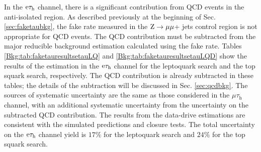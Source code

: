 \documentclass[12pt]{thesis}  %
\newcommand{\tauh}{\ensuremath{\tau_{\text{h}}}\xspace}
\newcommand{\Pe}{\ensuremath{\cmsSymbolFace{e}}\xspace}
\newcommand{\mutau}{\ensuremath{\mu\tauh}\xspace}
\newcommand{\etau}{\ensuremath{\Pe\tauh}\xspace}
\newcommand{\ra}{\ensuremath{\rightarrow}}%
\newcommand{\Zmm}{\ensuremath{\Z \ra \mu\mu}\xspace}%
\begin{document}
In the \etau channel, there is a significant contribution from QCD events in the anti-isolated region. As described previously at the beginning of Sec. \ref{sec:faketaubkg}, the fake rate measured in the \Zmm + jets control region is not appropriate for QCD events. The QCD contribution must be subtracted from the major reducible background estimation calculated using the fake rate. Tables \ref{Bkg:tab:faketauresultsetauLQ} and \ref{Bkg:tab:faketauresultsetauLQD} show the results of the estimation in the \etau channel for the leptoquark search and the top squark search, respectively. The QCD contribution is already subtracted in these tables; the details of the subtraction will be discussed in Sec. \ref{sec:qcdbkg}. The sources of systematic uncertainty are the same as those considered in the \mutau channel, with an additional systematic uncertainty from the uncertainty on the subtracted QCD contribution. The results from the data-drive estimations are consistent with the simulated predictions and closure tests. The total uncertainty on the \etau channel yield is $17\%$ for the leptoquark search and $24\%$ for the top squark search.
\end{document}
